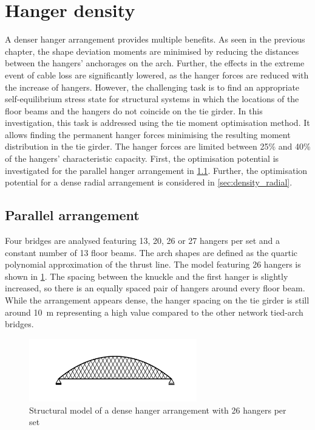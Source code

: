 \newpage
\section{Hanger density} \label{sec:hanger_density}
A denser hanger arrangement provides multiple benefits. As seen in the previous chapter, the shape deviation moments are minimised by reducing the distances between the hangers' anchorages on the arch. Further, the effects in the extreme event of cable loss are significantly lowered, as the hanger forces are reduced with the increase of hangers. 
However, the challenging task is to find an appropriate self-equilibrium stress state for structural systems in which the locations of the floor beams and the hangers do not coincide on the tie girder. 
In this investigation, this task is addressed using the tie moment optimisation method. It allows finding the permanent hanger forces minimising the resulting moment distribution in the tie girder. The hanger forces are limited between 25\% and 40\% of the hangers' characteristic capacity. First, the optimisation potential is investigated for the parallel hanger arrangement in \cref{sec:density_parallel}. Further, the optimisation potential for a dense radial arrangement is considered in \cref{sec:density_radial}.

\subsection{Parallel arrangement} \label{sec:density_parallel}
Four bridges are analysed featuring 13, 20, 26 or 27 hangers per set and a constant number of 13 floor beams. The arch shapes are defined as the quartic polynomial approximation of the thrust line. The model featuring 26 hangers is shown in \cref{fig:structure_26}. The spacing between the knuckle and the first hanger is slightly increased, so there is an equally spaced pair of hangers around every floor beam. While the arrangement appears dense, the hanger spacing on the tie girder is still around \SI{10}{m} representing a high value compared to the other network tied-arch bridges.

\begin{figure}[H]
    \centering
    \includegraphics[trim={0 1cm 0 1cm},clip, width=0.65\textwidth]{calculations/hanger density/structure_26.png}
    \caption{Structural model of a dense hanger arrangement with 26 hangers per set}
    \label{fig:structure_26}
\end{figure}

